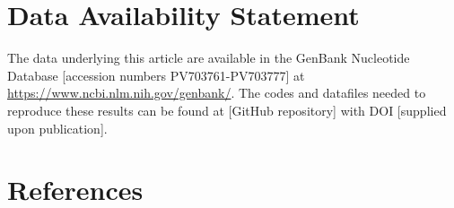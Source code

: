 \documentclass[
  letterpaper,
  DIV=11,
  numbers=noendperiod]{scrartcl}
\begin{document}
\section{Data Availability Statement}\label{data-availability-statement}

The data underlying this article are available in the GenBank Nucleotide
Database {[}accession numbers PV703761-PV703777{]} at
\url{https://www.ncbi.nlm.nih.gov/genbank/}. The codes and datafiles
needed to reproduce these results can be found at {[}GitHub
repository{]} with DOI {[}supplied upon publication{]}.

\section*{References}\label{references}
\end{document}
